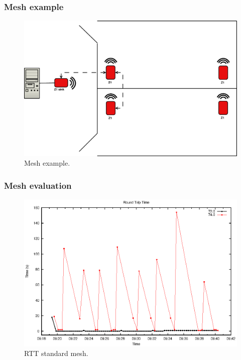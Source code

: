 \documentclass{beamer}
\begin{document}
\begin{frame}
\frametitle{Mesh example}
	
	\begin{center}
		\begin{figure}
			\includegraphics[width=\textwidth]{mesh_example.eps}
			\caption{Mesh example.}
		\end{figure}
	\end{center}
	
\end{frame}

\begin{frame}
\frametitle{Mesh evaluation}
	
	\begin{center}
		\begin{figure}
			\includegraphics[width=\textwidth]{plot_unpatched.eps}
			\caption{RTT standard mesh.}
		\end{figure}
	\end{center}
	
\end{frame}
\end{document}
